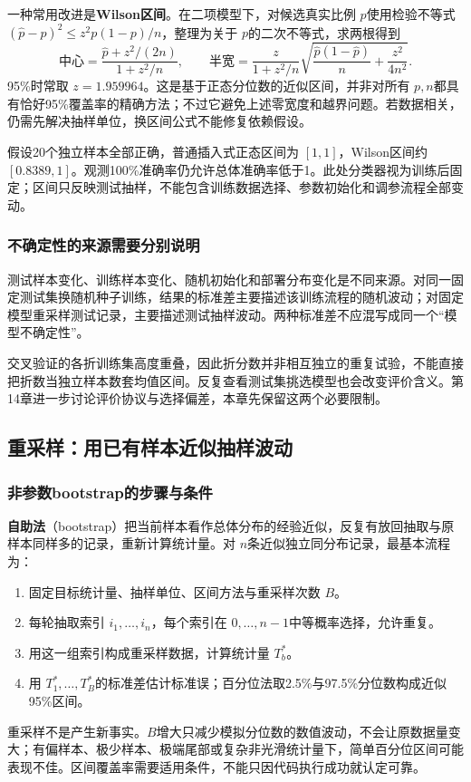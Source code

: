 \documentclass[UTF8,fontset=none,zihao=-4,a4paper]{ctexart}
\newcommand{\term}[1]{\textbf{#1}}
\numberwithin{equation}{section}
\numberwithin{figure}{section}
\begin{document}
一种常用改进是\term{Wilson区间}。在二项模型下，对候选真实比例 $p$使用检验不等式 $(\hat p-p)^2\le z^2p(1-p)/n$，整理为关于 $p$的二次不等式，求两根得到
\[
 \text{中心}=\frac{\hat p+z^2/(2n)}{1+z^2/n},\qquad
 \text{半宽}=\frac{z}{1+z^2/n}
 \sqrt{\frac{\hat p(1-\hat p)}n+\frac{z^2}{4n^2}}.
\]
95\%时常取 $z=1.959964$。这是基于正态分位数的近似区间，并非对所有 $p,n$都具有恰好95\%覆盖率的精确方法；不过它避免上述零宽度和越界问题。若数据相关，仍需先解决抽样单位，换区间公式不能修复依赖假设。

假设20个独立样本全部正确，普通插入式正态区间为 $[1,1]$，Wilson区间约 $[0.8389,1]$。观测100\%准确率仍允许总体准确率低于1。此处分类器视为训练后固定；区间只反映测试抽样，不能包含训练数据选择、参数初始化和调参流程全部变动。

\subsubsection{不确定性的来源需要分别说明}
测试样本变化、训练样本变化、随机初始化和部署分布变化是不同来源。对同一固定测试集换随机种子训练，结果的标准差主要描述该训练流程的随机波动；对固定模型重采样测试记录，主要描述测试抽样波动。两种标准差不应混写成同一个“模型不确定性”。

交叉验证的各折训练集高度重叠，因此折分数并非相互独立的重复试验，不能直接把折数当独立样本数套均值区间。反复查看测试集挑选模型也会改变评价含义。第14章进一步讨论评价协议与选择偏差，本章先保留这两个必要限制。

\subsection{重采样：用已有样本近似抽样波动}
\subsubsection{非参数bootstrap的步骤与条件}
\term{自助法}（bootstrap）把当前样本看作总体分布的经验近似，反复有放回抽取与原样本同样多的记录，重新计算统计量。对 $n$条近似独立同分布记录，最基本流程为：
\begin{enumerate}
\item 固定目标统计量、抽样单位、区间方法与重采样次数 $B$。
\item 每轮抽取索引 $i_1,\ldots,i_n$，每个索引在 $0,\ldots,n-1$中等概率选择，允许重复。
\item 用这一组索引构成重采样数据，计算统计量 $T_b^*$。
\item 用 $T_1^*,\ldots,T_B^*$的标准差估计标准误；百分位法取2.5\%与97.5\%分位数构成近似95\%区间。
\end{enumerate}
重采样不是产生新事实。$B$增大只减少模拟分位数的数值波动，不会让原数据量变大；有偏样本、极少样本、极端尾部或复杂非光滑统计量下，简单百分位区间可能表现不佳。区间覆盖率需要适用条件，不能只因代码执行成功就认定可靠。
\end{document}
